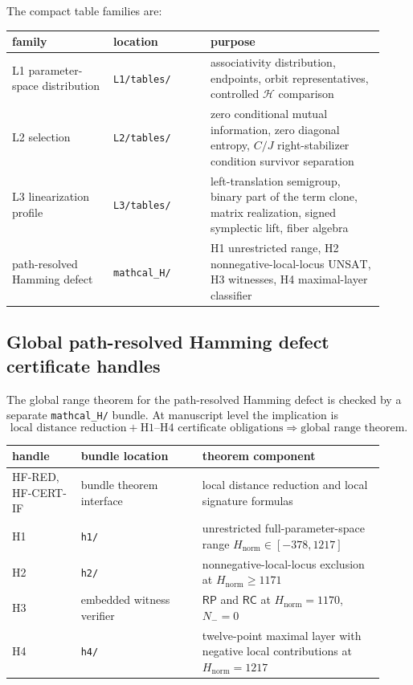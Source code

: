 \documentclass[11pt]{article}
\theoremstyle{definition}
\newcommand{\RP}{\mathsf{RP}}
\newcommand{\RC}{\mathsf{RC}}
\begin{document}
The compact table families are:

\begin{longtable}[]{@{}p{0.25\linewidth}p{0.24\linewidth}p{0.43\linewidth}@{}}
\toprule\noalign{}
family & location & purpose \\
\midrule\noalign{}
\endhead
\bottomrule\noalign{}
\endlastfoot
L1 parameter-space distribution & \texttt{L1/tables/} & associativity distribution, endpoints, orbit representatives, controlled \(\mathcal H\) comparison \\
L2 selection & \texttt{L2/tables/} & zero conditional mutual information, zero diagonal entropy, \(C/J\) right-stabilizer condition survivor separation \\
L3 linearization profile & \texttt{L3/tables/} & left-translation semigroup, binary part of the term clone, matrix realization, signed symplectic lift, fiber algebra \\
path-resolved Hamming defect & \texttt{mathcal\_H/} & H1 unrestricted range, H2 nonnegative-local-locus \(\mathrm{UNSAT}\), H3 witnesses, H4 maximal-layer classifier \\
\end{longtable}

\subsection[Global Hamming-defect certificate handles]{Global path-resolved Hamming defect certificate handles}\label{global-hamming-defect-certificate-handles}

The global range theorem for the path-resolved Hamming defect is checked by a separate
\texttt{mathcal\_H/} bundle.  At manuscript level the implication is
\[
\text{local distance reduction}
+
\text{H1--H4 certificate obligations}
\Longrightarrow
\text{global range theorem}.
\]

\begin{longtable}[]{@{}p{0.17\linewidth}p{0.30\linewidth}p{0.45\linewidth}@{}}
\toprule\noalign{}
handle & bundle location & theorem component \\
\midrule\noalign{}
\endhead
\bottomrule\noalign{}
\endlastfoot
HF-RED, HF-CERT-IF & bundle theorem interface & local distance reduction and local signature formulas \\
H1 & \texttt{h1/} & unrestricted full-parameter-space range \(H_{\mathrm{norm}}\in[-378,1217]\) \\
H2 & \texttt{h2/} & nonnegative-local-locus exclusion at \(H_{\mathrm{norm}}\ge1171\) \\
H3 & embedded witness verifier & \(\RP\) and \(\RC\) at \(H_{\mathrm{norm}}=1170\), \(N_-=0\) \\
H4 & \texttt{h4/} & twelve-point maximal layer with negative local contributions at \(H_{\mathrm{norm}}=1217\) \\
\end{longtable}
\end{document}
